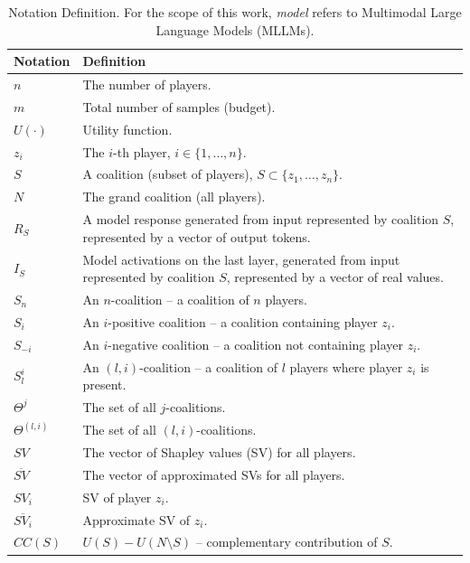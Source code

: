 \begin{table}[htbp]
\centering
\caption{Notation Definition. For the scope of this work, \textit{model} refers to Multimodal Large Language Models (MLLMs).}

\begin{tabular}{p{2cm} p{10cm}}

\toprule

\textbf{Notation} & \textbf{Definition} \\

\midrule

$n$ & The number of players. \\
$m$ & Total number of samples (budget). \\
$U(\cdot)$ & Utility function. \\
$z_i$ & The $i$-th player, $i \in \{1, \dots, n\}$. \\
$S$ & A coalition (subset of players), $S \subset \{z_1, \dots, z_n\}$. \\
$N$ & The grand coalition (all players). \\
$R_S$ & A model response generated from input represented by coalition $S$, represented by a vector of output tokens. \\
$I_S$ & Model activations on the last layer, generated from input represented by coalition $S$, represented by a vector of real values. \\
$S_n$ & An $n$-coalition -- a coalition of $n$ players. \\
$S_i$ & An $i$-positive coalition -- a coalition containing player $z_i$. \\
$S_{-i}$ & An $i$-negative coalition -- a coalition not containing player $z_i$. \\
$S_l^i$ & An $(l, i)$-coalition -- a coalition of $l$ players where player $z_i$ is present. \\
$\Theta^j$ & The set of all $j$-coalitions. \\
$\Theta^{(l, i)}$ & The set of all $(l, i)$-coalitions. \\
$SV$ & The vector of Shapley values (SV) for all players. \\
$\overline{SV}$ & The vector of approximated SVs for all players. \\
$SV_i$ & SV of player $z_i$. \\
$\overline{SV_i}$ & Approximate SV of $z_i$. \\
$CC(S)$ & $U(S) - U(N \setminus S)$ -- complementary contribution of $S$. \\

\bottomrule

\end{tabular}
\label{tab:shapley_values__notation_definition}
\end{table}

